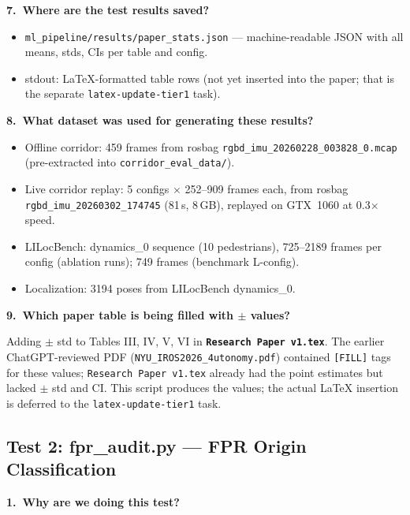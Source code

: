 \documentclass[11pt,a4paper]{article}
\begin{document}
\textbf{7.\ Where are the test results saved?}

\begin{itemize}[nosep]
  \item \texttt{ml\_pipeline/results/paper\_stats.json}
    --- machine-readable JSON with all means, stds, CIs per table
    and config.
  \item stdout: LaTeX-formatted table rows (not yet inserted into
    the paper; that is the separate \texttt{latex-update-tier1} task).
\end{itemize}

\textbf{8.\ What dataset was used for generating these results?}

\begin{itemize}[nosep]
  \item Offline corridor: 459 frames from rosbag
    \texttt{rgbd\_imu\_20260228\_003828\_0.mcap} (pre-extracted into
    \texttt{corridor\_eval\_data/}).
  \item Live corridor replay: 5 configs $\times$ 252--909 frames each,
    from rosbag \texttt{rgbd\_imu\_20260302\_174745} (81\,s, 8\,GB),
    replayed on GTX~1060 at 0.3$\times$ speed.
  \item LILocBench: dynamics\_0 sequence (10 pedestrians), 725--2189
    frames per config (ablation runs); 749 frames (benchmark L-config).
  \item Localization: 3194 poses from LILocBench dynamics\_0.
\end{itemize}

\textbf{9.\ Which paper table is being filled with $\pm$ values?}

Adding $\pm$ std to Tables III, IV, V, VI in
\textbf{\texttt{Research Paper v1.tex}}.
The earlier ChatGPT-reviewed PDF
(\texttt{NYU\_IROS2026\_4utonomy.pdf}) contained \texttt{[FILL]} tags
for these values; \texttt{Research Paper v1.tex} already had the
point estimates but lacked $\pm$ std and CI. This script produces the
values; the actual LaTeX insertion is deferred to the
\texttt{latex-update-tier1} task.

\subsection{Test 2: fpr\_audit.py --- FPR Origin Classification}
\label{sec:test-fpr-audit}

\textbf{1.\ Why are we doing this test?}
\end{document}
